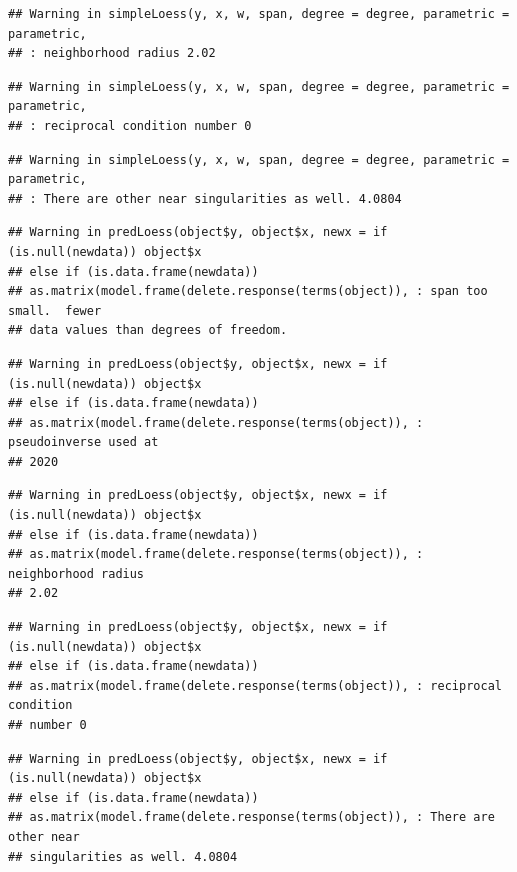 \documentclass[
]{article}
\begin{document}
\begin{verbatim}
## Warning in simpleLoess(y, x, w, span, degree = degree, parametric = parametric,
## : neighborhood radius 2.02
\end{verbatim}

\begin{verbatim}
## Warning in simpleLoess(y, x, w, span, degree = degree, parametric = parametric,
## : reciprocal condition number 0
\end{verbatim}

\begin{verbatim}
## Warning in simpleLoess(y, x, w, span, degree = degree, parametric = parametric,
## : There are other near singularities as well. 4.0804
\end{verbatim}

\begin{verbatim}
## Warning in predLoess(object$y, object$x, newx = if (is.null(newdata)) object$x
## else if (is.data.frame(newdata))
## as.matrix(model.frame(delete.response(terms(object)), : span too small.  fewer
## data values than degrees of freedom.
\end{verbatim}

\begin{verbatim}
## Warning in predLoess(object$y, object$x, newx = if (is.null(newdata)) object$x
## else if (is.data.frame(newdata))
## as.matrix(model.frame(delete.response(terms(object)), : pseudoinverse used at
## 2020
\end{verbatim}

\begin{verbatim}
## Warning in predLoess(object$y, object$x, newx = if (is.null(newdata)) object$x
## else if (is.data.frame(newdata))
## as.matrix(model.frame(delete.response(terms(object)), : neighborhood radius
## 2.02
\end{verbatim}

\begin{verbatim}
## Warning in predLoess(object$y, object$x, newx = if (is.null(newdata)) object$x
## else if (is.data.frame(newdata))
## as.matrix(model.frame(delete.response(terms(object)), : reciprocal condition
## number 0
\end{verbatim}

\begin{verbatim}
## Warning in predLoess(object$y, object$x, newx = if (is.null(newdata)) object$x
## else if (is.data.frame(newdata))
## as.matrix(model.frame(delete.response(terms(object)), : There are other near
## singularities as well. 4.0804
\end{verbatim}
\end{document}
